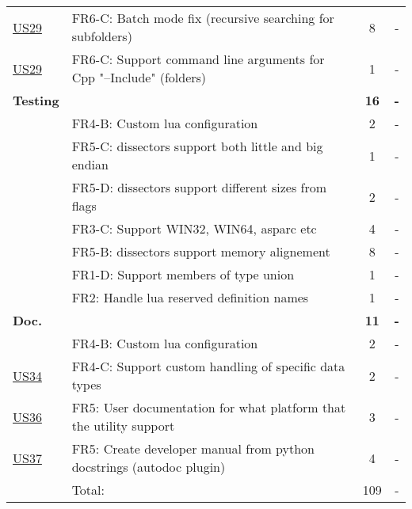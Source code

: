 \begin{table}[!htb]
\begin{tabularx}{\textwidth}{l X c c}
	\hyperref[tab:req:stories7]{US29} & FR6-C: Batch mode fix (recursive searching for subfolders) &  8  & - \\
	\hyperref[tab:req:stories7]{US29} & FR6-C: Support command line arguments for Cpp "--Include" (folders) & 1 & - \\
	\addlinespace
	\textbf{Testing} &  & \textbf{16} & \textbf{-} \\
	 & FR4-B: Custom \Gls{lua} configuration & 2 & - \\
	 & FR5-C: \Glspl{dissector} support both little and big \gls{endian} & 1 & - \\
	 & FR5-D: \Glspl{dissector} support different sizes from flags & 2 & - \\
	 & FR3-C: Support WIN32, WIN64, \gls{asparc} etc & 4 & - \\
	 & FR5-B: \Glspl{dissector} support memory alignement & 8 & - \\
	 & FR1-D: Support members of type \gls{union} & 1 & - \\
	 & FR2: Handle \Gls{lua} reserved definition names & 1 & - \\
	\addlinespace
	\textbf{Doc.} &  & \textbf{11} & \textbf{-} \\
	 & FR4-B: Custom \Gls{lua} configuration & 2 & - \\
	\hyperref[tab:req:stories8]{US34} & FR4-C: Support custom handling of specific data types & 2 & - \\
	\hyperref[tab:req:stories9]{US36} & FR5: User documentation for what platform that the \gls{utility} support & 3 & - \\
	\hyperref[tab:req:stories9]{US37} & FR5: Create developer manual from python docstrings (autodoc plugin) & 4 & - \\
	\midrule
	& Total: & 109 &  -\\
	\bottomrule
\end{tabularx}
\end{table}


